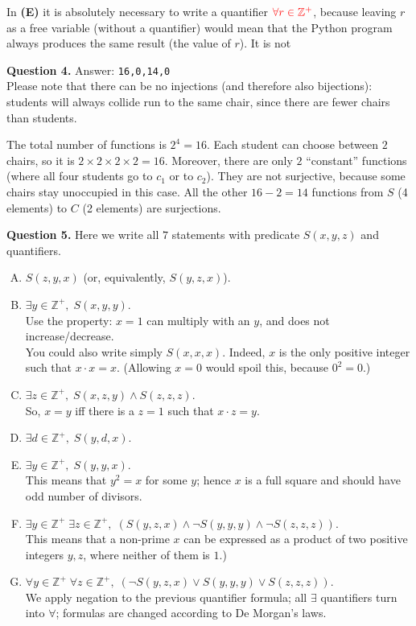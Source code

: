 \documentclass[jou]{apa6}
\begin{document}
In {\bf (E)} it is absolutely necessary to write a quantifier 
$\textcolor{red}{\forall r \in \mathbb{Z}^{+}}$, because 
leaving $r$ as a free variable (without a quantifier) would 
mean that the Python program always produces the same result
(the value of $r$). It is not 


\vspace{6pt}
{\bf Question 4.} Answer: {\tt 16,0,14,0}\\
Please note that there can be no injections (and therefore also bijections): 
students will always collide \textendash{} run to the same chair, 
since there are fewer chairs than students.

The total number of functions is $2^4 = 16$. Each student
can choose between $2$ chairs, so it is $2 \times 2 \times 2 \times 2 = 16$. 
Moreover, there are only $2$ ``constant'' functions (where all four
students go to $c_1$ or to $c_2$). They are not surjective, because
some chairs stay unoccupied in this case. 
All the other $16 - 2 = 14$ functions from $S$ (4 elements) to $C$ (2 elements)
are surjections. 

\vspace{6pt}
{\bf Question 5.} Here we write all $7$ statements with predicate $S(x,y,z)$ and quantifiers. 

\begin{enumerate}[(A)]
\item $S(z,y,x)$ (or, equivalently, $S(y,z,x)$). 
\item $\exists y \in \mathbb{Z}^{+},\; S(x,y,y)$.\\
Use the property: $x = 1$ can multiply with an $y$, and does not increase/decrease. \\
You could also write simply $S(x,x,x)$. Indeed, $x$ is the only 
positive integer such that $x \cdot x = x$. (Allowing $x = 0$ would 
spoil this, because $0^2 = 0$.)
\item $\exists z \in \mathbb{Z}^{+},\; S(x,z,y) \wedge S(z,z,z)$.\\
So, $x = y$ iff there is a $z = 1$ such that $x \cdot z = y$.
\item $\exists d \in \mathbb{Z}^{+},\; S(y,d,x)$.
\item $\exists y \in \mathbb{Z}^{+},\; S(y,y,x)$.\\ 
This means that $y^2 = x$ for some $y$; 
hence $x$ is a full square and should have odd number of divisors.
\item $\exists y \in \mathbb{Z}^{+}\;\exists z \in \mathbb{Z}^{+},\;(S(y,z,x) \wedge \neg S(y,y,y) \wedge \neg S(z,z,z))$.\\
This means that a non-prime $x$ can be expressed as a product of two positive integers $y,z$, 
where neither of them is $1$.)
\item $\forall y \in \mathbb{Z}^{+}\;\forall z \in \mathbb{Z}^{+},\;(\neg S(y,z,x) \vee S(y,y,y) \vee S(z,z,z))$.\\
We apply negation to the previous quantifier formula; all $\exists$ quantifiers turn into $\forall$; 
formulas are changed according to De Morgan's laws.
\end{enumerate}
\end{document}
